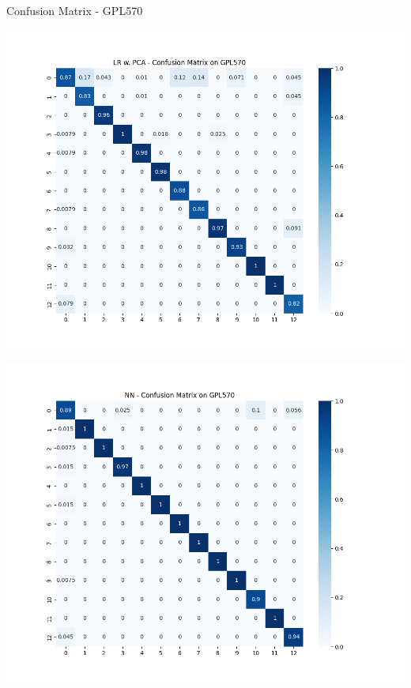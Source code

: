 \documentclass{beamer}
\begin{document}
    \begin{frame}{Confusion Matrix - GPL570}
        \begin{center}
            \hspace{-70pt}
            \begin{minipage}{0.4\textwidth}
                \includegraphics[scale=.3]{LRGPL570confusion.png}
            \end{minipage}
            \hspace{30pt}
            \begin{minipage}{0.4\textwidth}
                \includegraphics[scale=.3]{NNGPL570confusion.png}
            \end{minipage}
        \end{center}
    \end{frame}
\end{document}
